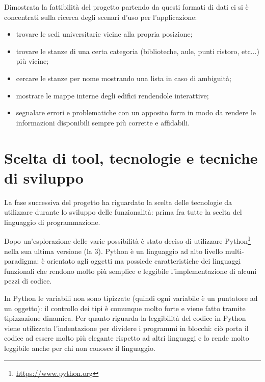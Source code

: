 \documentclass[12pt]{report}
\begin{document}
\vspace{5mm} %

Dimostrata la fattibilità del progetto partendo da questi formati di dati ci si è concentrati sulla ricerca degli scenari d'uso per l'applicazione:        
\begin{itemize}
\item trovare le sedi universitarie vicine alla propria posizione;
\item trovare le stanze di una certa categoria (biblioteche, aule, punti ristoro, etc...) più vicine;
\item cercare le stanze per nome mostrando una lista in caso di ambiguità;
\item mostrare le mappe interne degli edifici rendendole interattive;
\item segnalare errori e problematiche con un apposito form in modo da rendere le informazioni disponibili sempre più corrette e affidabili.
\end{itemize}


\newpage
\section{Scelta di tool, tecnologie e tecniche di sviluppo}

La fase successiva del progetto ha riguardato la scelta delle tecnologie da utilizzare durante lo sviluppo delle funzionalità: prima fra tutte la scelta del linguaggio di programmazione.

Dopo un'esplorazione delle varie possibilità è stato deciso di utilizzare Python\footnote{\url{https://www.python.org}} nella sua ultima versione (la 3). Python è un linguaggio ad alto livello multi-paradigma: è orientato agli oggetti ma possiede caratteristiche dei linguaggi funzionali che rendono molto più semplice e leggibile l'implementazione di alcuni pezzi di codice.

In Python le variabili non sono tipizzate (quindi ogni variabile è un puntatore ad un oggetto): il controllo dei tipi è comunque molto forte e viene fatto tramite tipizzazione dinamica.
Per quanto riguarda la leggibilità del codice in Python viene utilizzata l'indentazione per dividere i programmi in blocchi: ciò porta il codice ad essere molto più elegante rispetto ad altri linguaggi e lo rende molto leggibile anche per chi non conosce il linguaggio.
\end{document}
